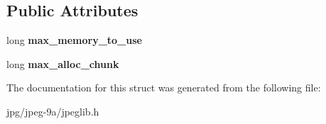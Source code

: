 \subsection*{Public Attributes}
\begin{DoxyCompactItemize}
\item 
\hypertarget{structjpeg__memory__mgr_aa7ef7c0d7ffbfcbee837ae9cb8b12c7e}{long {\bfseries max\+\_\+memory\+\_\+to\+\_\+use}}\label{structjpeg__memory__mgr_aa7ef7c0d7ffbfcbee837ae9cb8b12c7e}

\item 
\hypertarget{structjpeg__memory__mgr_a0301712c8796bb5555093d72b37c5a58}{long {\bfseries max\+\_\+alloc\+\_\+chunk}}\label{structjpeg__memory__mgr_a0301712c8796bb5555093d72b37c5a58}

\end{DoxyCompactItemize}


The documentation for this struct was generated from the following file\+:\begin{DoxyCompactItemize}
\item 
jpg/jpeg-\/9a/jpeglib.\+h\end{DoxyCompactItemize}
